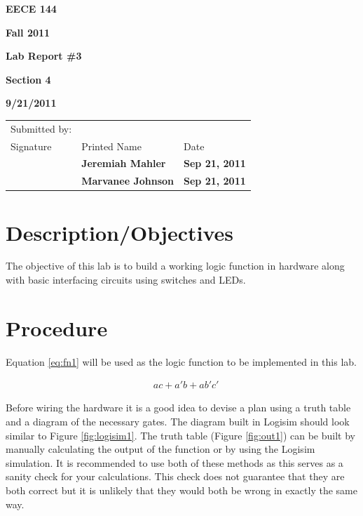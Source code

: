 \documentclass[12pt]{article}
\begin{document}

\centerline{\bf EECE 144}
\centerline{\bf Fall 2011}
\centerline{\bf}
\centerline{\bf Lab Report \#3}
\centerline{\bf Section 4}
\centerline{\bf 9/21/2011}

\begin{center}
\begin{tabularx}{\textwidth}[b]{X l l}
Submitted by: & & \\
Signature & Printed Name & Date \\
\hline
\multicolumn{1}{|X|}{} & \multicolumn{1}{|l|}{\bigstrut \bf Jeremiah Mahler} & \multicolumn{1}{|l|}{\bf Sep 21, 2011} \\
\hline
\multicolumn{1}{|X|}{} & \multicolumn{1}{|l|}{\bigstrut \bf Marvanee Johnson} & \multicolumn{1}{|l|}{\bf Sep 21, 2011} \\
\hline
\end{tabularx}
\end{center}

\section{Description/Objectives}

The objective of this lab is to build a working logic function
in hardware along with basic interfacing circuits using switches
and LEDs.

\section{Procedure}

\label{sec:plan}
Equation \ref{eq:fn1} will be used as the logic function to be implemented in
this lab.

\begin{align}
& a c + a' b + a b' c' \label{eq:fn1}
\end{align}

Before wiring the hardware it is a good idea to devise a plan using
a truth table and a diagram of the necessary gates.
The diagram built in Logisim should look similar to Figure \ref{fig:logisim1}.
The truth table (Figure \ref{fig:out1}) can be built by manually calculating
the output of the function or by using the Logisim simulation.
It is recommended to use both of these methods as this serves as a sanity
check for your calculations.
This check does not guarantee that they are both correct but it is unlikely that
they would both be wrong in exactly the same way.
\nocite{roth2009fundamentals}
\nocite{LOGISIM}
\end{document}
